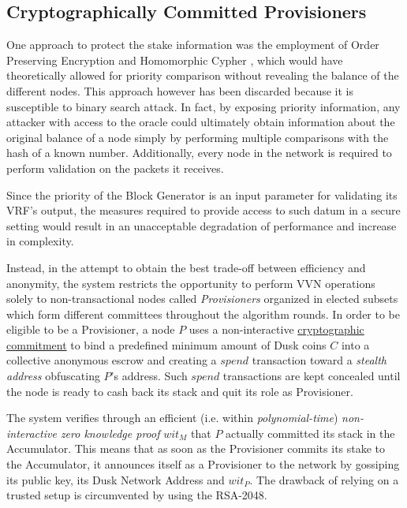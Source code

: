 \subsection{Cryptographically Committed Provisioners}
\label{sec:Cryptographically-Committed-Provisioners}
One approach to protect the stake information was the employment of Order Preserving Encryption and Homomorphic Cypher \cite{alec}, which would have theoretically allowed for priority comparison without revealing the balance of the different nodes. This approach however has been discarded because it is susceptible to binary search attack. In fact, by exposing priority information, any attacker with access to the oracle could ultimately obtain information about the original balance of a node simply by performing multiple comparisons with the hash of a known number. Additionally, every node in the network is required to perform validation on the packets it receives.

Since the priority of the Block Generator is an input parameter for validating its VRF’s output, the measures required to provide access to such datum in a secure setting would result in an unacceptable degradation of performance and increase in complexity.

Instead, in the attempt to obtain the best trade-off between efficiency and anonymity, the system restricts the opportunity to perform VVN operations solely to non-transactional nodes called \textit{Provisioners} organized in elected subsets which form different committees throughout the algorithm rounds. In order to be eligible to be a Provisioner, a node $P$ uses a non-interactive \hyperref[sec:Cryptographic-Accumulator]{cryptographic commitment} to bind a predefined minimum amount of \textrm{Dusk} coins $C$ into a collective anonymous escrow and creating a $spend$ transaction toward a \textit{stealth address} obfuscating $P$'s address. Such $spend$ transactions are kept concealed until the node is ready to cash back its stack and quit its role as Provisioner.

The system verifies through an efficient (i.e. within \textit{polynomial-time}) \textit{non-interactive zero knowledge proof}  $wit_M$ that $P$ actually committed its stack in the Accumulator. This means that as soon as the Provisioner commits its stake to the Accumulator, it announces itself as a Provisioner to the network by gossiping its public key, its \textrm{Dusk} Network Address and $wit_P$. The drawback of relying on a trusted setup is circumvented by using the RSA-2048.

